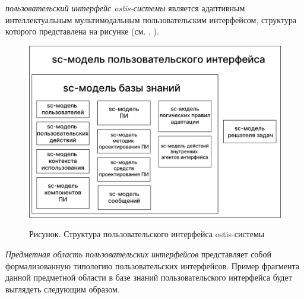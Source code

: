 \textit{пользовательский интерфейс ostis-системы} является адаптивным интеллектуальным мультимодальным пользовательским интерфейсом, структура которого представлена на рисунке \textit{} (см. , ).

\begin{figure}[H]
	\caption{Рисунок. Структура пользовательского интерфейса ostis-системы}
	\includegraphics[scale=0.3]{author/part4/figures/ui_model.png}
	\label{fig:ostis_ui_structure}
\end{figure}

\textit{Предметная область пользовательских интерфейсов} представляет собой формализованную типологию пользовательских интерфейсов. Пример фрагмента данной предметной области в базе знаний пользовательского интерфейса будет выглядеть следующим образом.

\begin{SCn}
\end{SCn}

